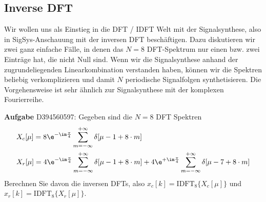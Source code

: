 \clearpage
\subsection{Inverse DFT}
\label{sec:D394560597}
\begin{Ziel}
Wir wollen uns als Einstieg in die DFT / IDFT Welt mit der Signalsynthese, also
in SigSys-Anschauung mit der inversen DFT beschäftigen. Dazu diskutieren wir zwei ganz einfache
Fälle, in denen das $N=8$ DFT-Spektrum nur einen bzw. zwei Einträge hat, die nicht Null sind.
Wenn wir die Signalsynthese anhand der zugrundeliegenden Linearkombination
verstanden haben, können wir die Spektren beliebig verkomplizieren und damit
$N$ periodische Signalfolgen synthetisieren.
Die Vorgehensweise ist sehr ähnlich zur Signalsynthese mit der komplexen
Fourierreihe.
\end{Ziel}
\textbf{Aufgabe} {\tiny D394560597}: Gegeben sind die $N=8$ DFT Spektren
\begin{align}
&X_c[\mu] = 8\e^{-\im\frac{\pi}{4}} \sum_{m=-\infty}^{+\infty} \delta[\mu-1 + 8 \cdot m]\\
&X_r[\mu] =
4\e^{-\im\frac{\pi}{4}} \sum_{m=-\infty}^{+\infty} \delta[\mu-1 + 8 \cdot m] +
4\e^{+\im\frac{\pi}{4}} \sum_{m=-\infty}^{+\infty} \delta[\mu-7 + 8 \cdot m]
\end{align}
Berechnen Sie davon die inversen DFTs, also $x_c[k] = \text{IDFT}_8\{X_c[\mu]\}$
und $x_r[k] = \text{IDFT}_8\{X_r[\mu]\}$.

